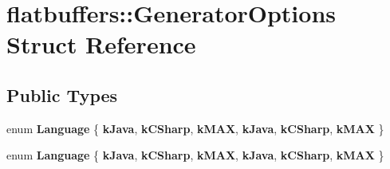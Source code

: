 \hypertarget{structflatbuffers_1_1GeneratorOptions}{}\section{flatbuffers\+:\+:Generator\+Options Struct Reference}
\label{structflatbuffers_1_1GeneratorOptions}
\subsection*{Public Types}
\begin{DoxyCompactItemize}
\item 
\mbox{\label{structflatbuffers_1_1GeneratorOptions_a071968db5df776f4eee45e5027dcb09d}} 
enum {\bfseries Language} \{ \newline
{\bfseries k\+Java}, 
{\bfseries k\+C\+Sharp}, 
{\bfseries k\+M\+AX}, 
{\bfseries k\+Java}, 
\newline
{\bfseries k\+C\+Sharp}, 
{\bfseries k\+M\+AX}
 \}
\item 
\mbox{\label{structflatbuffers_1_1GeneratorOptions_a071968db5df776f4eee45e5027dcb09d}} 
enum {\bfseries Language} \{ \newline
{\bfseries k\+Java}, 
{\bfseries k\+C\+Sharp}, 
{\bfseries k\+M\+AX}, 
{\bfseries k\+Java}, 
\newline
{\bfseries k\+C\+Sharp}, 
{\bfseries k\+M\+AX}
 \}
\end{DoxyCompactItemize}
